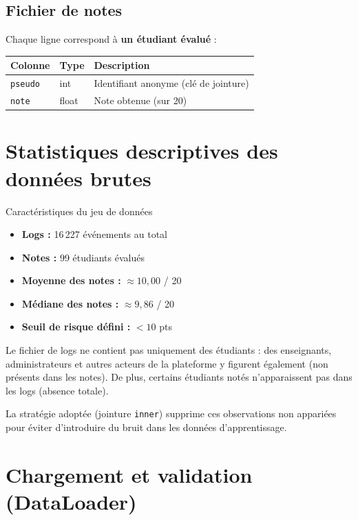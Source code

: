 \documentclass[12pt, a4paper, french]{report}
\begin{document}
\subsection{Fichier de notes}

Chaque ligne correspond à \textbf{un étudiant évalué} :

\begin{center}
\begin{tabular}{lll}
\toprule
\textbf{Colonne} & \textbf{Type} & \textbf{Description}\\
\midrule
\texttt{pseudo} & int   & Identifiant anonyme (clé de jointure)\\
\texttt{note}   & float & Note obtenue (sur 20)\\
\bottomrule
\end{tabular}
\end{center}

\section{Statistiques descriptives des données brutes}

\begin{resultbox}{Caractéristiques du jeu de données}
\begin{itemize}
  \item \textbf{Logs :} 16\,227 événements au total
  \item \textbf{Notes :} 99 étudiants évalués
  \item \textbf{Moyenne des notes :} $\approx 10{,}00$ / 20
  \item \textbf{Médiane des notes :} $\approx 9{,}86$ / 20
  \item \textbf{Seuil de risque défini :} $<10$ pts
\end{itemize}
\end{resultbox}

\begin{warningbox}
Le fichier de logs ne contient pas uniquement des étudiants : des enseignants, administrateurs et autres acteurs de la plateforme y figurent également (non présents dans les notes).
De plus, certains étudiants notés n'apparaissent pas dans les logs (absence totale).

La stratégie adoptée (jointure \texttt{inner}) supprime ces observations non appariées pour éviter d'introduire du bruit dans les données d'apprentissage.
\end{warningbox}

\section{Chargement et validation (DataLoader)}
\end{document}
